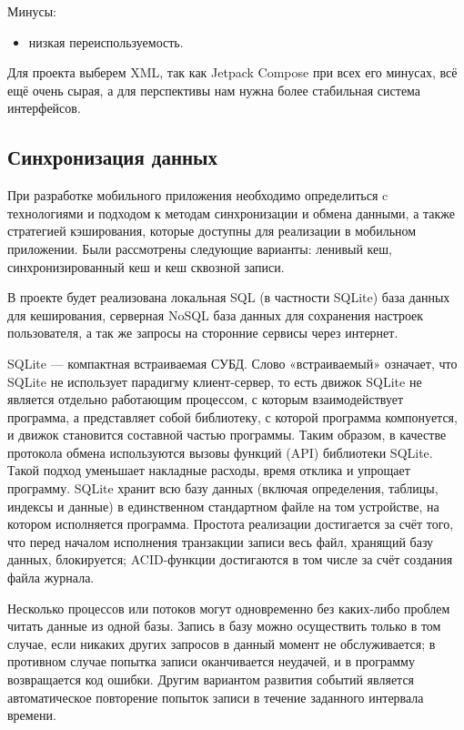 Минусы:
\begin{itemize}
 \item низкая переиспользуемость.
\end{itemize}

Для проекта выберем XML, так как Jetpack Compose при всех его минусах, всё ещё очень сырая, а для перспективы нам нужна более стабильная система интерфейсов.

\subsection{Синхронизация данных}
При разработке мобильного приложения необходимо определиться c технологиями и подходом к методам синхронизации и обмена данными, а также стратегией кэширования, которые доступны для реализации в мобильном приложении. Были рассмотрены следующие варианты: ленивый кеш, синхронизированный кеш и кеш сквозной записи. 
 
В проекте будет реализована локальная SQL (в частности SQLite) база данных для кеширования, серверная NoSQL база данных для сохранения настроек пользователя, а так же запросы на сторонние сервисы через интернет.

SQLite — компактная встраиваемая СУБД. Слово «встраиваемый» означает, что SQLite не использует парадигму клиент-сервер, то есть движок SQLite не является отдельно работающим процессом, с которым взаимодействует программа, а представляет собой библиотеку, с которой программа компонуется, и движок становится составной частью программы. Таким образом, в качестве протокола обмена используются вызовы функций (API) библиотеки SQLite. Такой подход уменьшает накладные расходы, время отклика и упрощает программу. SQLite хранит всю базу данных (включая определения, таблицы, индексы и данные) в единственном стандартном файле на том устройстве, на котором исполняется программа. Простота реализации достигается за счёт того, что перед началом исполнения транзакции записи весь файл, хранящий базу данных, блокируется; ACID-функции достигаются в том числе за счёт создания файла журнала.

Несколько процессов или потоков могут одновременно без каких-либо проблем читать данные из одной базы. Запись в базу можно осуществить только в том случае, если никаких других запросов в данный момент не обслуживается; в противном случае попытка записи оканчивается неудачей, и в программу возвращается код ошибки. Другим вариантом развития событий является автоматическое повторение попыток записи в течение заданного интервала времени.

